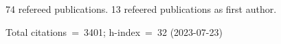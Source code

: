 74 refereed publications. 13 refeered publications as first author.

Total citations~=~3401; h-index~=~32 (2023-07-23)